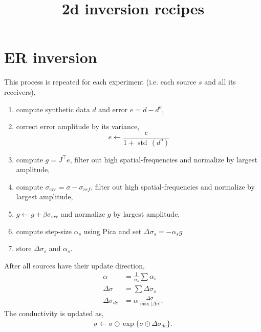 \documentclass[a4paper,12pt]{article}
\title{2d inversion recipes}
\author{}
\date{}
\begin{document}
\maketitle
%
%
% 
\section*{ER inversion}
This process is repeated for each experiment (i.e. each source $s$ and all its receivers),
\begin{enumerate}
\item compute synthetic data $d$ and error $e=d-d^o$,
\item correct error amplitude by its variance,
\[
e\gets \frac{e}{1+\operatorname{std}\,(d^o)}
\]
\item compute $g=J^\top e$, filter out high spatial-frequencies and normalize by largest amplitude,
\item compute $\sigma_{err}=\sigma-\sigma_{ref}$, filter out high spatial-frequencies and normalize by largest amplitude,
\item $g\gets g+\beta\sigma_{err}$ and normalize $g$ by largest amplitude,
\item compute step-size $\alpha_s$ using Pica and set $\Delta\sigma_s=-\alpha_s g$
\item store $\Delta\sigma_s$ and $\alpha_s$.
\end{enumerate}
After all sources have their update direction,
\begin{align*}
\alpha &= \frac{1}{n_s} \sum\alpha_s \\
\Delta\sigma &= \sum\Delta\sigma_s \\
\Delta\sigma_{dc} &= \alpha\frac{\Delta\sigma}{\max | \Delta\sigma |}.
\end{align*}
The conductivity is updated as,
\begin{align*}
\sigma\gets\sigma\odot\exp\{\sigma\odot\Delta\sigma_{dc}\}.
\end{align*}
% 
\end{document}
